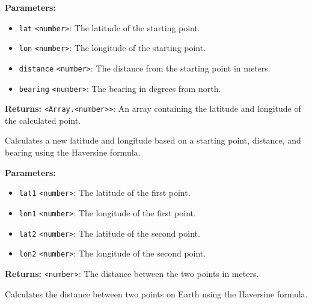\documentclass[12pt,a4paper]{article}
\begin{document}
\vspace{5mm}
\noindent {}


\noindent \textbf{Parameters:}
\begin{itemize}
  \item \texttt{lat} \texttt{<number>}: The latitude of the starting point.
  \item \texttt{lon} \texttt{<number>}: The longitude of the starting point.
  \item \texttt{distance} \texttt{<number>}: The distance from the starting point in meters.
  \item \texttt{bearing} \texttt{<number>}: The bearing in degrees from north.
\end{itemize}

\noindent \textbf{Returns:} \texttt{<Array.<number>>}: An array containing the latitude and longitude of the calculated point.

\noindent Calculates a new latitude and longitude based on a starting point, distance, and bearing using the Haversine formula.

\vspace{5mm}
\noindent {}


\noindent \textbf{Parameters:}
\begin{itemize}
  \item \texttt{lat1} \texttt{<number>}: The latitude of the first point.
  \item \texttt{lon1} \texttt{<number>}: The longitude of the first point.
  \item \texttt{lat2} \texttt{<number>}: The latitude of the second point.
  \item \texttt{lon2} \texttt{<number>}: The longitude of the second point.
\end{itemize}

\noindent \textbf{Returns:} \texttt{<number>}: The distance between the two points in meters.

\noindent Calculates the distance between two points on Earth using the Haversine formula.

\vspace{5mm}
\noindent {}
\end{document}
